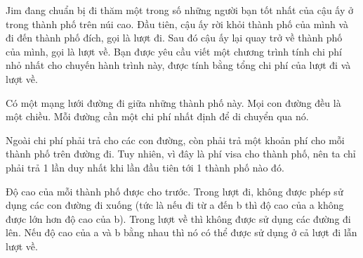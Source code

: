 Jim đang chuẩn bị đi thăm một trong số những người bạn tốt nhất của cậu ấy ở trong thành phố trên núi cao. Đầu tiên, cậu ấy rời khỏi thành phố của mình và đi đến thành phố đích, gọi là lượt đi. Sau đó cậu ấy lại quay trở về thành phố của mình, gọi là lượt về. Bạn được yêu cầu viết một chương trình tính chi phí nhỏ nhất cho chuyến hành trình này, được tính bằng tổng chi phí của lượt đi và lượt về.     

      Có một mạng lưới đường đi giữa những thành phố này. Mọi con đường đều là một chiều. Mỗi đường cần một chi phí nhất định để di chuyển qua nó.     

      Ngoài chi phí phải trả cho các con đường, còn phải trả một khoản phí cho mỗi thành phố trên đường đi. Tuy nhiên, vì đây là phí visa cho thành phố, nên ta chỉ phải trả 1 lần duy nhất khi lần đầu tiên tới 1 thành phố nào đó.     

      Độ cao của mỗi thành phố được cho trước. Trong lượt đi, không được phép sử dụng các con đường đi xuống (tức là nếu đi từ a đến b thì độ cao của a không được lớn hơn độ cao của b). Trong lượt về thì không được sử dụng các đường đi lên. Nếu độ cao của a và b bằng nhau thì nó có thể được sử dụng ở cả lượt đi lẫn lượt về.